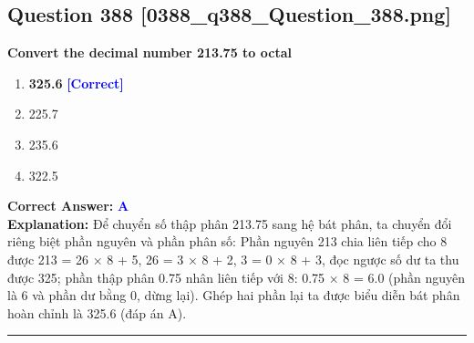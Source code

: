 \documentclass[11pt,a4paper]{article}
\begin{document}
\begin{minipage}{\textwidth}
\subsection*{Question 388 \quad \footnotesize{[0388\_q388\_Question\_388.png]}}
\noindent \textbf{Convert the decimal number 213.75 to octal}

\begin{enumerate}[label=\Alph*.]
    \item \textbf{325.6} \hfill \textcolor{blue}{\textbf{[Correct]}}
    \item 225.7
    \item 235.6
    \item 322.5
\end{enumerate}

\noindent \textbf{Correct Answer:} \textcolor{blue}{\textbf{A}} \\[2pt]
\noindent \textbf{Explanation:} Để chuyển số thập phân 213.75 sang hệ bát phân, ta chuyển đổi riêng biệt phần nguyên và phần phân số: Phần nguyên 213 chia liên tiếp cho 8 được 213 = 26 × 8 + 5, 26 = 3 × 8 + 2, 3 = 0 × 8 + 3, đọc ngược số dư ta thu được 325; phần thập phân 0.75 nhân liên tiếp với 8: 0.75 × 8 = 6.0 (phần nguyên là 6 và phần dư bằng 0, dừng lại). Ghép hai phần lại ta được biểu diễn bát phân hoàn chỉnh là 325.6 (đáp án A).

\par\vspace{0.3cm}
\hrule
\vspace{0.3cm}
\end{minipage}
\end{document}
